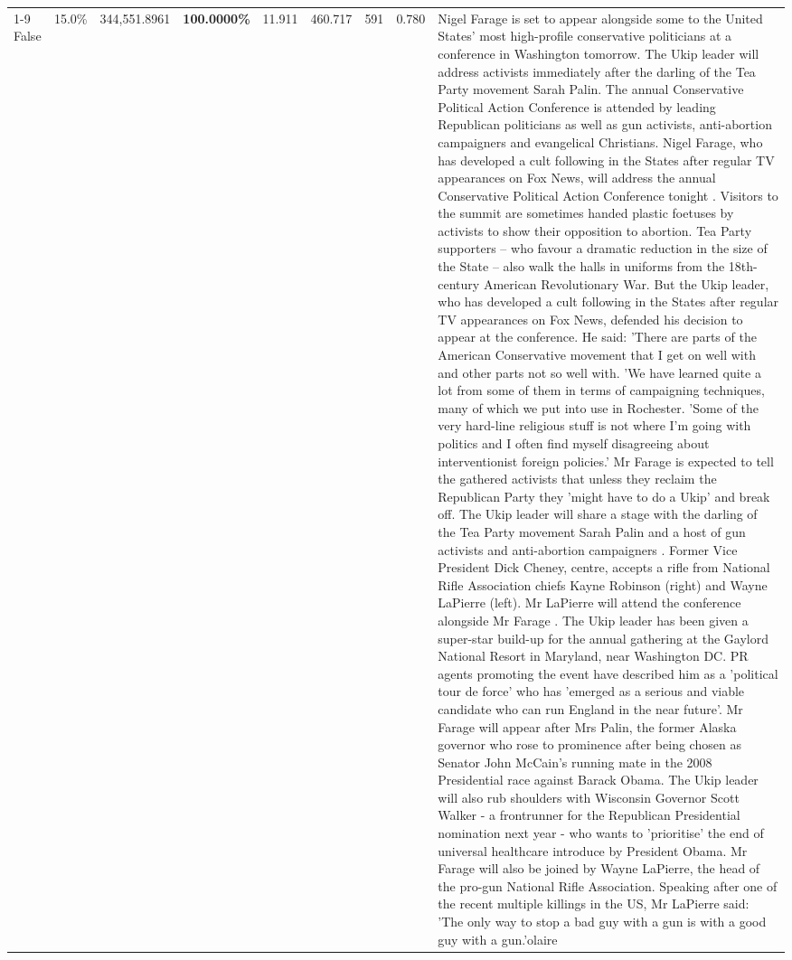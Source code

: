 \begin{table}[H]
\begin{tabular}{lllrlllll}
\cline{1-9}
False & 15.0\% & 344,551.8961 & \bfseries \color{red} 100.0000\% & 11.911 & 460.717 & 591 & 0.780 & Nigel Farage is set to appear alongside some to the United States' most high-profile conservative politicians at a conference in Washington tomorrow. The Ukip leader will address activists immediately after the darling of the Tea Party movement Sarah Palin. The annual Conservative Political Action Conference is attended by leading Republican politicians as well as gun activists, anti-abortion campaigners and evangelical Christians. Nigel Farage, who has developed a cult following in the States after regular TV appearances on Fox News, will address the annual Conservative Political Action Conference tonight . Visitors to the summit are sometimes handed plastic foetuses by activists to show their opposition to abortion. Tea Party supporters – who favour a dramatic reduction in the size of the State – also walk the halls in uniforms from the 18th-century American Revolutionary War. But the Ukip leader, who has developed a cult following in the States after regular TV appearances on Fox News, defended his decision to appear at the conference. He said: 'There are parts of the American Conservative movement that I get on well with and other parts not so well with. 'We have learned quite a lot from some of them in terms of campaigning techniques, many of which we put into use in Rochester. 'Some of the very hard-line religious stuff is not where I'm going with politics and I often find myself disagreeing about interventionist foreign policies.' Mr Farage is expected to tell the gathered activists that unless they reclaim the Republican Party they 'might have to do a Ukip' and break off. The Ukip leader will share a stage with the darling of the Tea Party movement Sarah Palin and a host of gun activists and anti-abortion campaigners . Former Vice President Dick Cheney, centre, accepts a rifle from National Rifle Association chiefs Kayne Robinson (right) and Wayne LaPierre (left). Mr LaPierre will attend the conference alongside Mr Farage . The Ukip leader has been given a super-star build-up for the annual gathering at the Gaylord National Resort in Maryland, near Washington DC. PR agents promoting the event have described him as a 'political tour de force' who has 'emerged as a serious and viable candidate who can run England in the near future'. Mr Farage will appear after Mrs Palin, the former Alaska governor who rose to prominence after being chosen as Senator John McCain's running mate in the 2008 Presidential race against Barack Obama. The Ukip leader will also rub shoulders with Wisconsin Governor Scott Walker - a frontrunner for the Republican Presidential nomination next year - who wants to 'prioritise' the end of universal healthcare introduce by President Obama. Mr Farage will also be joined by Wayne LaPierre, the head of the pro-gun National Rifle Association. Speaking after one of the recent multiple killings in the US, Mr LaPierre said: 'The only way to stop a bad guy with a gun is with a good guy with a gun.'olaire \\

\end{tabular}
\end{table}
